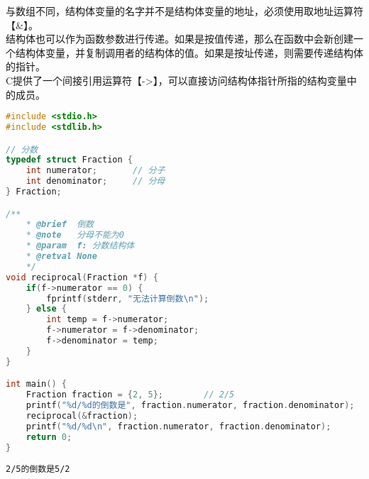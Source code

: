 与数组不同，结构体变量的名字并不是结构体变量的地址，必须使用取地址运算符【\&】。\\

结构体也可以作为函数参数进行传递。如果是按值传递，那么在函数中会新创建一个结构体变量，并复制调用者的结构体的值。如果是按址传递，则需要传递结构体的指针。\\

C提供了一个间接引用运算符【->】，可以直接访问结构体指针所指的结构变量中的成员。\\


\begin{lstlisting}[language=C]
#include <stdio.h>
#include <stdlib.h>

// 分数
typedef struct Fraction {
    int numerator;       // 分子
    int denominator;     // 分母
} Fraction;

/**
    * @brief  倒数
    * @note   分母不能为0
    * @param  f: 分数结构体
    * @retval None
    */
void reciprocal(Fraction *f) {
    if(f->numerator == 0) {
        fprintf(stderr, "无法计算倒数\n");
    } else {
        int temp = f->numerator;
        f->numerator = f->denominator;
        f->denominator = temp;
    }
}

int main() {
    Fraction fraction = {2, 5};        // 2/5
    printf("%d/%d的倒数是", fraction.numerator, fraction.denominator);
    reciprocal(&fraction);
    printf("%d/%d\n", fraction.numerator, fraction.denominator);
    return 0;
}
\end{lstlisting}

\begin{tcolorbox}
	\begin{verbatim}
2/5的倒数是5/2
	\end{verbatim}
\end{tcolorbox}

\newpage